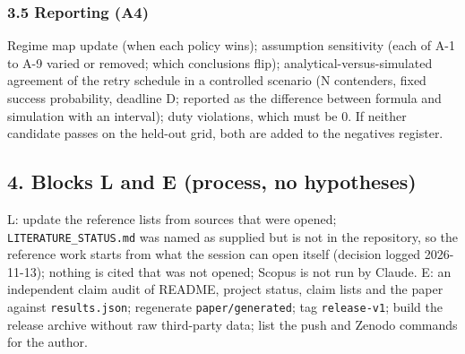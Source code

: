 \subsubsection*{3.5 Reporting (A4)}
Regime map update (when each policy wins); assumption sensitivity (each of A-1 to A-9 varied or removed; which conclusions flip); analytical-versus-simulated agreement of the retry schedule in a controlled scenario (N contenders, fixed success probability, deadline D; reported as the difference between formula and simulation with an interval); duty violations, which must be 0. If neither candidate passes on the held-out grid, both are added to the negatives register.

\subsection*{4. Blocks L and E (process, no hypotheses)}
L: update the reference lists from sources that were opened; \texttt{LITERATURE\_STATUS.md} was named as supplied but is not in the repository, so the reference work starts from what the session can open itself (decision logged 2026-11-13); nothing is cited that was not opened; Scopus is not run by Claude. E: an independent claim audit of README, project status, claim lists and the paper against \texttt{results.json}; regenerate \texttt{paper/generated}; tag \texttt{release-v1}; build the release archive without raw third-party data; list the push and Zenodo commands for the author.

